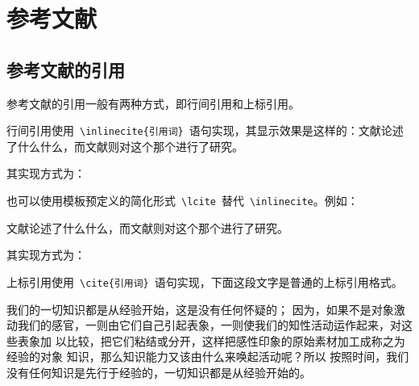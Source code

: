 
%
%
%

\chapter{参考文献}
\label{chap07}

\section{参考文献的引用}

参考文献的引用一般有两种方式，即行间引用和上标引用。

行间引用使用~\verb|\inlinecite{引用词}|~语句实现，其显示效果是这样的：文献论述了什么什么，而文献则对这个那个进行了研究。

其实现方式为：

\texttt{}

也可以使用模板预定义的简化形式~\verb|\lcite|~替代~\verb|\inlinecite|。例如：

文献论述了什么什么，而文献则对这个那个进行了研究。

其实现方式为：

\texttt{}

上标引用使用~\verb|\cite{引用词}|~语句实现，下面这段文字是普通的上标引用格式。

我们的一切知识都是从经验开始\cite{LQL1999}，这是没有任何怀疑的\cite{DXM2005}\cite{DXM2000}；
因为，如果不是对象激动我们的感官，一则由它们自己引起表象，一则使我们的知性活动运作起来，对这些表象加
以比较，把它们粘结或分开\cite{OJP1999,OJP1991}，这样把感性印象的原始素材加工成称之为经验的对象
知识，那么知识能力又该由什么来唤起活动呢\cite{braun2007,kelton2002,strawderman2001,LQL1999}？所以
按照时间，我们没有任何知识是先行于经验的，一切知识都是从经验开始的。

